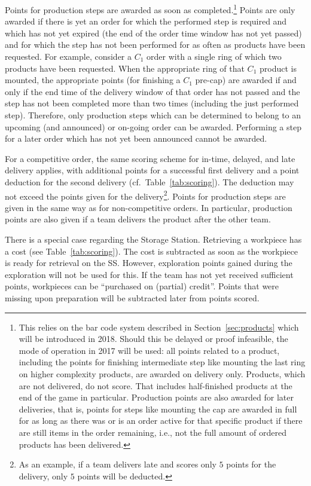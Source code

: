 \documentclass[12pt,twoside]{article}
\newcommand{\refsec}[1]{Section~\ref{#1}}
\newcommand{\reftab}[1]{Table~\ref{#1}}
\begin{document}
Points for production steps are awarded as soon as
completed.\footnote{This relies on the bar code system described in
  \refsec{sec:products} which will be introduced in 2018. Should this
  be delayed or proof infeasible, the mode of operation in 2017 will
  be used: all points related to a product, including the points for
  finishing intermediate step like mounting the last ring on higher
  complexity products, are awarded on delivery only. Products, which
  are not delivered, do not score. That includes half-finished
  products at the end of the game in particular. Production points are
  also awarded for later deliveries, that is, points for steps like
  mounting the cap are awarded in full for as long as there was or is
  an order active for that specific product if there are still items
  in the order remaining, i.e., not the full amount of ordered products
  has been delivered.}
%
Points are only awarded if there is yet an order for which the
performed step is required and which has not yet expired (the end of
the order time window has not yet passed) and for which the step has
not been performed for as often as products have been requested. For
example, consider a $C_1$ order with a single ring of which two
products have been requested. When the appropriate ring of that $C_1$
product is mounted, the appropriate points (for finishing a $C_1$
pre-cap) are awarded if and only if the end time of the delivery
window of that order has not passed and the step has not been
completed more than two times (including the just performed
step). Therefore, only production steps which can be determined to
belong to an upcoming (and announced) or on-going order can be
awarded. Performing a step for a later order which has not yet been
announced cannot be awarded.

For a competitive order, the same scoring scheme for in-time, delayed, and late
delivery applies, with additional points for a successful first delivery and a
point deduction for the second delivery (cf.~\reftab{tab:scoring}). The
deduction may not exceed the points given for the delivery\footnote{As an
example, if a team delivers late and scores only $5$ points for the delivery,
only $5$ points will be deducted.}. Points for production steps are given in the
same way as for non-competitive orders. In particular, production points are
also given if a team delivers the product after the other team.

There is a special case regarding the Storage Station. Retrieving a
workpiece has a cost (see \reftab{tab:scoring}). The cost is
subtracted as soon as the workpiece is ready for retrieval on the SS\@.
However, exploration points gained during the exploration will not be
used for this. If the team has not yet received sufficient points,
workpieces can be ``purchased on (partial) credit''. Points that were
missing upon preparation will be subtracted later from points scored.
\end{document}
